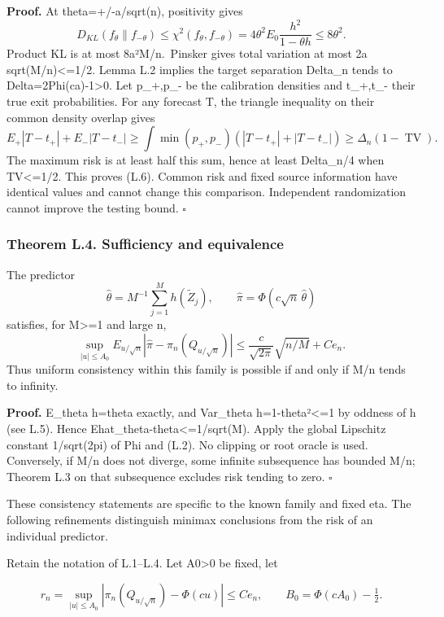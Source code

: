 \textbf{Proof.} At theta=+/-a/sqrt(n), positivity gives \[
D_{KL}(f_\theta\|f_{-\theta})\le\chi^2(f_\theta,f_{-\theta})
=4\theta^2 E_0\frac{h^2}{1-\theta h}\le8\theta^2.
\] Product KL is at most 8a²M/n.~Pinsker gives total variation at most
2a sqrt(M/n)\textless=1/2. Lemma L.2 implies the target separation
Delta\_n tends to Delta=2Phi(ca)-1\textgreater0. Let p\_+,p\_- be the
calibration densities and t\_+,t\_- their true exit probabilities. For
any forecast T, the triangle inequality on their common density overlap
gives \[
E_+|T-t_+|+E_-|T-t_-|
\ge\int\min(p_+,p_-)(|T-t_+|+|T-t_-|)
\ge\Delta_n(1-\operatorname{TV}).
\] The maximum risk is at least half this sum, hence at least Delta\_n/4
when TV\textless=1/2. This proves (L.6). Common risk and fixed source
information have identical values and cannot change this comparison.
Independent randomization cannot improve the testing bound. \(\square\)

\subsubsection{Theorem L.4. Sufficiency and
equivalence}\label{local_prediction-theorem-l.4.-sufficiency-and-equivalence}

The predictor \[
\widehat\theta=M^{-1}\sum_{j=1}^M h(\widetilde Z_j),\qquad
\widehat\pi=\Phi(c\sqrt n\,\widehat\theta)
\] satisfies, for M\textgreater=1 and large n, \[
\sup_{|u|\le A_0} E_{u/\sqrt n}|\widehat\pi-\pi_n(Q_{u/\sqrt n})|
\le \frac{c}{\sqrt{2\pi}}\sqrt{n/M}+Ce_n.
\tag{L.7}
\] Thus uniform consistency within this family is possible if and only
if M/n tends to infinity.

\textbf{Proof.} E\_theta h=theta exactly, and Var\_theta
h=1-theta²\textless=1 by oddness of h (see L.5). Hence
E\textbar hat\_theta-theta\textbar\textless=1/sqrt(M). Apply the global
Lipschitz constant 1/sqrt(2pi) of Phi and (L.2). No clipping or root
oracle is used. Conversely, if M/n does not diverge, some infinite
subsequence has bounded M/n; Theorem L.3 on that subsequence excludes
risk tending to zero. \(\square\)

These consistency statements are specific to the known family and fixed
eta. The following refinements distinguish minimax conclusions from the
risk of an individual predictor.

Retain the notation of L.1--L.4. Let A0\textgreater0 be fixed, let

\[
r_n=\sup_{|u|\le A_0}|\pi_n(Q_{u/\sqrt n})-\Phi(cu)|\le C e_n,
\qquad B_0=\Phi(cA_0)-\tfrac12.
\]

